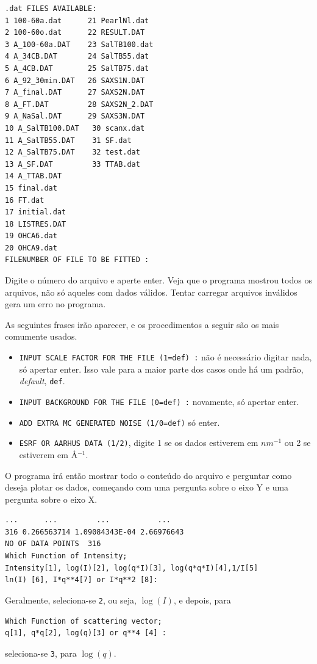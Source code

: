 \begin{apendicesenv}
\begin{verbatim}
.dat FILES AVAILABLE:
1 100-60a.dat      21 PearlNl.dat
2 100-60o.dat      22 RESULT.DAT
3 A_100-60a.DAT    23 SalTB100.dat
4 A_34CB.DAT       24 SalTB55.dat
5 A_4CB.DAT        25 SalTB75.dat
6 A_92_30min.DAT   26 SAXS1N.DAT
7 A_final.DAT      27 SAXS2N.DAT
8 A_FT.DAT         28 SAXS2N_2.DAT
9 A_NaSal.DAT      29 SAXS3N.DAT
10 A_SalTB100.DAT   30 scanx.dat
11 A_SalTB55.DAT    31 SF.dat
12 A_SalTB75.DAT    32 test.dat
13 A_SF.DAT         33 TTAB.dat
14 A_TTAB.DAT
15 final.dat
16 FT.dat
17 initial.dat
18 LISTRES.DAT
19 OHCA6.dat
20 OHCA9.dat
FILENUMBER OF FILE TO BE FITTED :
\end{verbatim}

Digite o número do arquivo e aperte enter. Veja que o programa mostrou todos os arquivos, não só aqueles com dados válidos. Tentar carregar arquivos inválidos gera um erro no programa.

As seguintes frases irão aparecer, e os procedimentos a seguir são os mais comumente usados.

\begin{itemize}
	\item \texttt{INPUT SCALE FACTOR FOR THE FILE (1=def) :} não é necessário digitar nada, só apertar enter. Isso vale para a maior parte dos casos onde há um padrão, \emph{default}, \texttt{def}.
	\item \texttt{INPUT BACKGROUND FOR THE FILE (0=def) :} novamente, só apertar enter.
	\item \texttt{ADD EXTRA MC GENERATED NOISE (1/0=def)} só enter.
	\item \texttt{ESRF OR AARHUS DATA (1/2)}, digite 1 se os dados estiverem em \(nm^{-1}\) ou 2 se estiverem em \AA\(^{-1}\).
\end{itemize}

O programa irá então mostrar todo o conteúdo do arquivo e perguntar como deseja plotar os dados, começando com uma pergunta sobre o eixo Y e uma pergunta sobre o eixo X.

\begin{verbatim}
...      ...         ...           ...
316 0.266563714 1.09084343E-04 2.66976643
NO OF DATA POINTS  316
Which Function of Intensity;
Intensity[1], log(I)[2], log(q*I)[3], log(q*q*I)[4],1/I[5]
ln(I) [6], I*q**4[7] or I*q**2 [8]:
\end{verbatim}

Geralmente, seleciona-se \texttt{2}, ou seja, \(\log(I)\), e depois, para 
\begin{verbatim}Which Function of scattering vector;
q[1], q*q[2], log(q)[3] or q**4 [4] :\end{verbatim} seleciona-se \texttt{3}, para \(\log(q)\).


\end{apendicesenv}
